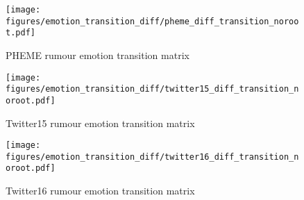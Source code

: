 \begin{figure}[t!]
    \centering
    \texttt{[image: figures/emotion\_transition\_diff/pheme\_diff\_transition\_noroot.pdf]}
    \caption{PHEME rumour emotion transition matrix}
	\label{fig:pheme_transition_diff}
\end{figure}

\begin{figure}[t!]
    \centering
    \texttt{[image: figures/emotion\_transition\_diff/twitter15\_diff\_transition\_noroot.pdf]}
    \caption{Twitter15 rumour emotion transition matrix}
	\label{fig:twitter15_transition_diff}
\end{figure}

\begin{figure}[t!]
    \centering
    \texttt{[image: figures/emotion\_transition\_diff/twitter16\_diff\_transition\_noroot.pdf]}
    \caption{Twitter16 rumour emotion transition matrix}
	\label{fig:twitter16_transition_diff}
\end{figure}


